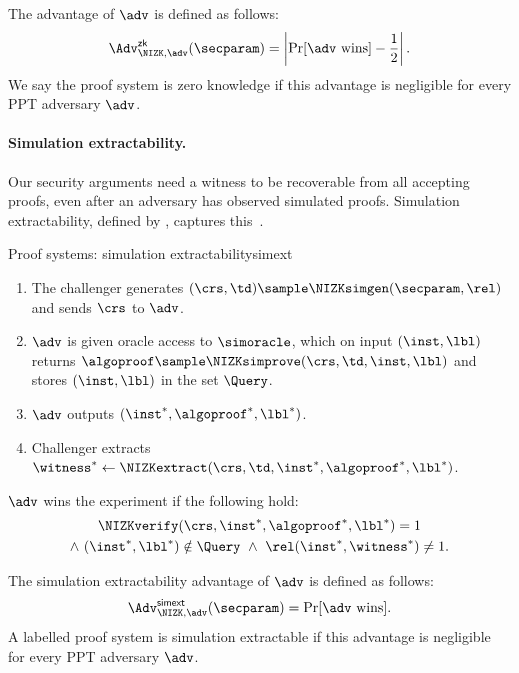 The advantage of $\adv$ is defined as follows:
%
\begin{equation*}
%
  \Adv^{\mathsf{zk}}_{\NIZK, \adv}(\secparam) = \left| \Pr[\adv\text{
wins}] - \frac{1}{2} \right|.
%
\end{equation*}
%
We say the proof system is zero knowledge if this
advantage is negligible for every PPT adversary $\adv$.

\paragraph{Simulation extractability.} Our security arguments need a
witness to be recoverable from all accepting proofs, even after an adversary has
observed simulated proofs. Simulation extractability, defined by
, captures this~\cite{FOCS:Sahai99,C:DDOPS01,AC:Groth06}.

\begin{experimentbox}{Proof systems: simulation extractability}{simext}

  \begin{enumerate}

    \item The challenger generates $(\crs, \td) \sample \NIZKsimgen(\secparam,
\rel)$
and sends $\crs$ to $\adv$.

    \item $\adv$ is given oracle access to $\simoracle$, which on input $(\inst,
\lbl)$ returns $\algoproof \sample \NIZKsimprove(\crs, \td, \inst, \lbl)$ and
stores $(\inst, \lbl)$ in the set $\Query$.

    \item $\adv$ outputs $(\inst^*, \algoproof^*, \lbl^*)$.

    \item Challenger extracts $\witness^* \leftarrow \NIZKextract(\crs, \td,
\inst^*, \algoproof^*, \lbl^*)$.

  \end{enumerate}

  $\adv$ wins the experiment if the following hold:
  \begin{gather*}
    \NIZKverify(\crs, \inst^*, \algoproof^*, \lbl^*) = 1 \\
    \wedge\ (\inst^*, \lbl^*) \notin \Query \ \wedge\ \rel(\inst^*, \witness^*) \neq 1.
  \end{gather*}

\end{experimentbox}

The simulation extractability advantage of $\adv$ is defined as follows:
%
\begin{equation*}
%
  \Adv^{\mathsf{simext}}_{\NIZK, \adv}(\secparam) = \Pr[\adv\text{
wins}].
%
\end{equation*}
%
A labelled proof system is simulation extractable if this advantage is negligible
for every PPT adversary $\adv$.

